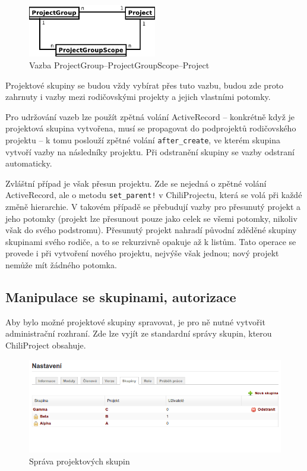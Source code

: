 \documentclass[thesis=B,czech]{FITthesis}[2012/05/02]
\begin{document}
\begin{figure}[htbp]
\centering
\includegraphics[width=0.5\textwidth]{group-er4.pdf}
\caption{Vazba ProjectGroup--ProjectGroupScope--Project}
\end{figure}

Projektové skupiny se budou vždy vybírat přes tuto vazbu, budou zde
proto zahrnuty i vazby mezi rodičovskými projekty a jejich vlastními
potomky.

Pro udržování vazeb lze použít zpětná volání ActiveRecord -- konkrétně
když je projektová skupina vytvořena, musí se propagovat do podprojektů
rodičovského projektu -- k tomu poslouží zpětné volání
\lstinline!after_create!, ve kterém skupina vytvoří vazby na následníky
projektu. Při odstranění skupiny se vazby odstraní automaticky.

Zvláštní případ je však přesun projektu. Zde se nejedná o zpětné volání
ActiveRecord, ale o metodu \lstinline"set_parent!" v ChiliProjectu,
která se volá při každé změně hierarchie. V takovém případě se přebudují
vazby pro přesunutý projekt a jeho potomky (projekt lze přesunout pouze
jako celek se všemi potomky, nikoliv však do svého podstromu). Přesunutý
projekt nahradí původní zděděné skupiny skupinami svého rodiče, a to se
rekurzivně opakuje až k listům.
Tato operace se provede i při vytvoření nového projektu, nejvýše však
jednou; nový projekt nemůže mít žádného potomka.

\subsection{Manipulace se skupinami, autorizace}

Aby bylo možné projektové skupiny spravovat, je pro ně nutné vytvořit
administrační rozhraní. Zde lze vyjít ze standardní správy skupin, kterou
ChiliProject obsahuje.

\begin{figure}[tbp]
\centering
\includegraphics[width=1\textwidth]{group-gui1.png}
\caption{Správa projektových skupin}
\end{figure}
\end{document}
